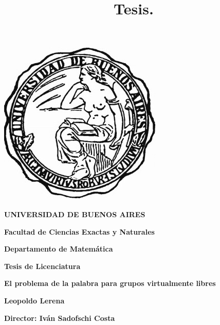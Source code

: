 \documentclass[10pt]{book}
\title{\color{red!55!black} Tesis.}
\date{}
\begin{document}
\thispagestyle{empty}

\begin {center}

\includegraphics[scale=.3]{LogoUBA.jpg}


\medskip
\textbf{\color{astral!40!black} UNIVERSIDAD DE BUENOS AIRES}

\smallskip

\textbf{\color{astral!40!black}Facultad de Ciencias Exactas y Naturales}

\smallskip

\textbf{\color{astral!40!black}Departamento de Matem\'atica}

\vspace{3.5cm}

\textbf{\large \color{astral!40!black} Tesis de Licenciatura}


\vspace{1.5cm}

\textbf{\large \color{astral!40!black} El problema de la palabra para grupos virtualmente libres}

\vspace{1.5cm}


\textbf{\color{astral!40!black} Leopoldo Lerena}

\end {center}


\vspace{1.5cm}

\noindent \textbf{\color{astral!40!black} Director:  Iván Sadofschi Costa}


\vspace{3cm}

\tableofcontents
{}
\newpage




	




%



\end{document}
